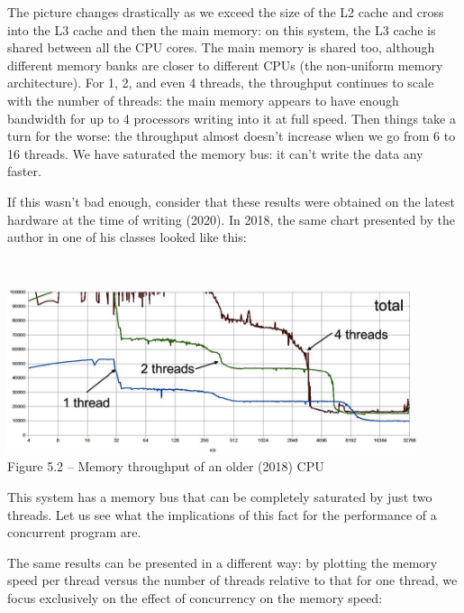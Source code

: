 The picture changes drastically as we exceed the size of the L2 cache and cross into the L3 cache and then the main memory: on this system, the L3 cache is shared between all the CPU cores. The main memory is shared too, although different memory banks are closer to different CPUs (the non-uniform memory architecture). For 1, 2, and even 4 threads, the throughput continues to scale with the number of threads: the main memory appears to have enough bandwidth for up to 4 processors writing into it at full speed. Then things take a turn for the worse: the throughput almost doesn't increase when we go from 6 to 16 threads. We have saturated the memory bus: it can't write the data any faster.

If this wasn't bad enough, consider that these results were obtained on the latest hardware at the time of writing (2020). In 2018, the same chart presented by the author in one of his classes looked like this:

\hspace*{\fill} \\ %
\begin{center}
\includegraphics[width=0.9\textwidth]{content/1/chapter5/images/2.jpg}\\
Figure 5.2 – Memory throughput of an older (2018) CPU
\end{center}

This system has a memory bus that can be completely saturated by just two threads. Let us see what the implications of this fact for the performance of a concurrent program are.


The same results can be presented in a different way: by plotting the memory speed per thread versus the number of threads relative to that for one thread, we focus exclusively on the effect of concurrency on the memory speed:

